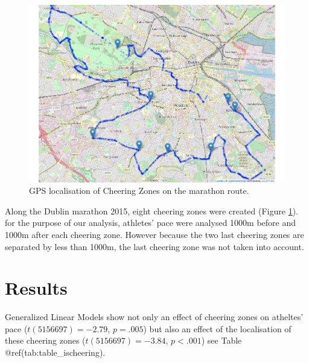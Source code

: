 \documentclass[,man]{apa6}
\theoremstyle{definition}
\theoremstyle{definition}
\theoremstyle{definition}
\theoremstyle{remark}
\begin{document}
\begin{figure}

{\centering \includegraphics{marathon_cheering_effect_files/figure-latex/cheering-zones-map-1} 

}

\caption{GPS localisation of Cheering Zones on the marathon route.}\label{fig:cheering-zones-map}
\end{figure}

Along the Dublin marathon 2015, eight cheering zones were created
(Figure \ref{fig:cheering-zones-map}). for the purpose of our analysis,
athletes' pace were analysed 1000m before and 1000m after each cheering
zone. However because the two last cheering zones are separated by less
than 1000m, the last cheering zone was not taken into account.

\section{Results}\label{results}

Generalized Linear Models show not only an effect of cheering zones on
atheltes' pace (\(t(5156697) = -2.79\), \(p = .005\)) but also an effect
of the localisation of these cheering zones (\(t(5156697) = -3.84\),
\(p < .001\)) see Table @ref(tab:table\_ischeering).
\end{document}
